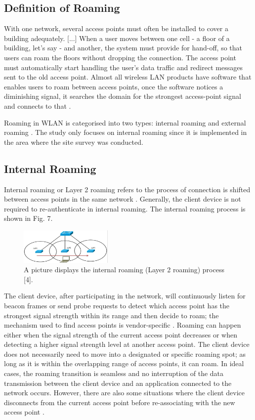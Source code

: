 \documentclass[conference]{IEEEtran}
\begin{document}
\subsection{Definition of Roaming}

With one network, several access points must often be installed to cover a building adequately. [...] When a user moves between one cell - a floor of a building, let's say - and another, the system must provide for hand-off, so that users can roam the floors without dropping the connection. The access point must automatically start handling the user's data traffic and redirect messages sent to the old access point. Almost all wireless LAN products have software that enables users to roam between access points, once the software notices a diminishing signal, it searches the domain for the strongest access-point signal and connects to that \cite{wickelgren1996}.

Roaming in WLAN is categorised into two types: internal roaming and external roaming \cite{wiki_roaming}. The study only focuses on internal roaming since it is implemented in the area where the site survey was conducted.

\subsection{Internal Roaming}

Internal roaming or Layer 2 roaming refers to the process of connection is shifted between access points in the same network \cite{article_example}. Generally, the client device is not required to re-authenticate in internal roaming. The internal roaming process is shown in Fig. 7.

\begin{figure}[htbp]
    \centering
    \includegraphics[width=0.4\textwidth]{internal_roaming.png}
    \caption{A picture displays the internal roaming (Layer 2 roaming) process
[4].}
\end{figure}

The client device, after participating in the network, will continuously listen for beacon frames or send probe requests to detect which access point has the strongest signal strength within its range and then decide to roam; the mechanism used to find access points is vendor-specific \cite{article_example}. Roaming can happen either when the signal strength of the current access point decreases or when detecting a higher signal strength level at another access point. The client device does not necessarily need to move into a designated or specific roaming spot; as long as it is within the overlapping range of access points, it can roam. In ideal cases, the roaming transition is seamless and no interruption of the data transmission between the client device and an application connected to the network occurs. However, there are also some situations where the client device disconnects from the current access point before re-associating with the new access point \cite{article_example} \cite{book_example}.
\end{document}
